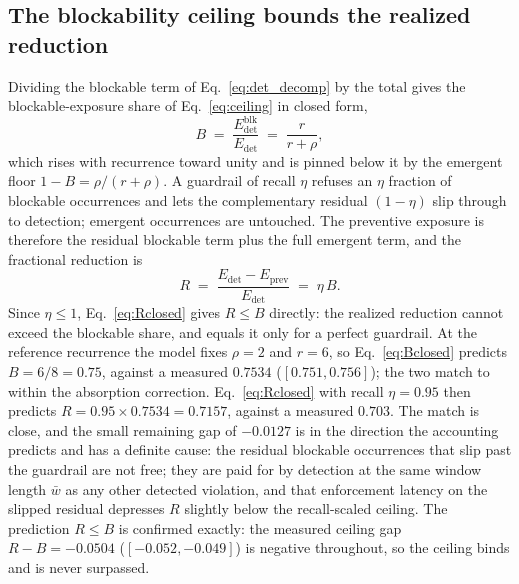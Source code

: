 \documentclass[journal]{IEEEtran}
\begin{document}
\subsection{The blockability ceiling bounds the realized reduction}
Dividing the blockable term of Eq.~\eqref{eq:det_decomp} by the total gives the blockable-exposure
share of Eq.~\eqref{eq:ceiling} in closed form,
\begin{equation}
B \;=\; \frac{E^{\text{blk}}_{\text{det}}}{E_{\text{det}}} \;=\; \frac{r}{r + \rho},
\label{eq:Bclosed}
\end{equation}
which rises with recurrence toward unity and is pinned below it by the emergent floor
$1 - B = \rho / (r + \rho)$. A guardrail of recall $\eta$ refuses an $\eta$ fraction of blockable
occurrences and lets the complementary residual $(1 - \eta)$ slip through to detection; emergent
occurrences are untouched. The preventive exposure is therefore the residual blockable term plus
the full emergent term, and the fractional reduction is
\begin{equation}
R \;=\; \frac{E_{\text{det}} - E_{\text{prev}}}{E_{\text{det}}}
\;=\; \eta\, B .
\label{eq:Rclosed}
\end{equation}
Since $\eta \le 1$, Eq.~\eqref{eq:Rclosed} gives $R \le B$ directly: the realized reduction cannot
exceed the blockable share, and equals it only for a perfect guardrail. At the reference recurrence
the model fixes $\rho = 2$ and $r = 6$, so Eq.~\eqref{eq:Bclosed} predicts
$B = 6 / 8 = 0.75$, against a measured $0.7534$ ($[0.751, 0.756]$); the two match to within the
absorption correction. Eq.~\eqref{eq:Rclosed} with recall $\eta = 0.95$ then predicts
$R = 0.95 \times 0.7534 = 0.7157$, against a measured $0.703$. The match is close, and the small
remaining gap of $-0.0127$ is in the direction the accounting predicts and has a definite cause:
the residual blockable occurrences that slip past the guardrail are not free; they are paid for by
detection at the same window length $\bar w$ as any other detected violation, and that enforcement
latency on the slipped residual depresses $R$ slightly below the recall-scaled ceiling. The
prediction $R \le B$ is confirmed exactly: the measured ceiling gap $R - B = -0.0504$
($[-0.052, -0.049]$) is negative throughout, so the ceiling binds and is never surpassed.
\end{document}
